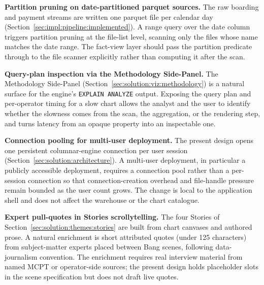 \textbf{Partition pruning on date-partitioned parquet sources.} The raw boarding and payment streams are written one parquet file per calendar day (Section~\ref{sec:impl:pipeline:implemented}). A range query over the date column triggers partition pruning at the file-list level, scanning only the files whose name matches the date range. The fact-view layer should pass the partition predicate through to the file scanner explicitly rather than computing it after the scan.

\textbf{Query-plan inspection via the Methodology Side-Panel.} The Methodology Side-Panel (Section~\ref{sec:solution:viz:methodology}) is a natural surface for the engine's \texttt{EXPLAIN ANALYZE} output. Exposing the query plan and per-operator timing for a slow chart allows the analyst and the user to identify whether the slowness comes from the scan, the aggregation, or the rendering step, and turns latency from an opaque property into an inspectable one.

\textbf{Connection pooling for multi-user deployment.} The present design opens one persistent columnar-engine connection per user session (Section~\ref{sec:solution:architecture}). A multi-user deployment, in particular a publicly accessible deployment, requires a connection pool rather than a per-session connection so that connection-creation overhead and file-handle pressure remain bounded as the user count grows. The change is local to the application shell and does not affect the warehouse or the chart catalogue.

\textbf{Expert pull-quotes in Stories scrollytelling.} The four Stories of Section~\ref{sec:solution:themes:stories} are built from chart canvases and authored prose. A natural enrichment is short attributed quotes (under 125 characters) from subject-matter experts placed between Bang scenes, following data-journalism convention. The enrichment requires real interview material from named MCPT or operator-side sources; the present design holds placeholder slots in the scene specification but does not draft live quotes.
